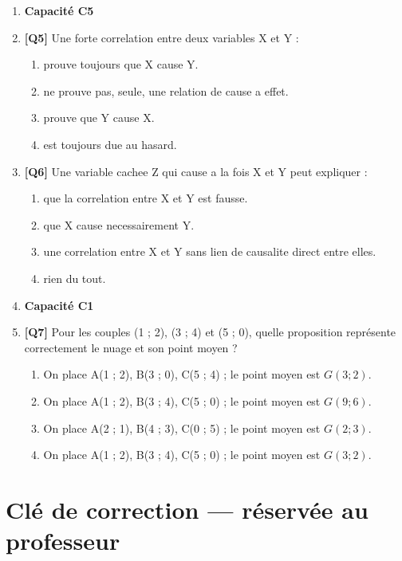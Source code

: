 \begin{enumerate}
\item[] \textbf{Capacité C5}

\item \textbf{[Q5]} Une forte correlation entre deux variables X et Y :
  \begin{enumerate}[label=\Alph*.]
    \item prouve toujours que X cause Y.
    \item ne prouve pas, seule, une relation de cause a effet.
    \item prouve que Y cause X.
    \item est toujours due au hasard.
  \end{enumerate}

\item \textbf{[Q6]} Une variable cachee Z qui cause a la fois X et Y peut expliquer :
  \begin{enumerate}[label=\Alph*.]
    \item que la correlation entre X et Y est fausse.
    \item que X cause necessairement Y.
    \item une correlation entre X et Y sans lien de causalite direct entre elles.
    \item rien du tout.
  \end{enumerate}

\item[] \textbf{Capacité C1}

\item \textbf{[Q7]} Pour les couples (1 ; 2), (3 ; 4) et (5 ; 0), quelle proposition représente correctement le nuage et son point moyen ?
  \begin{enumerate}[label=\Alph*.]
    \item On place A(1 ; 2), B(3 ; 0), C(5 ; 4) ; le point moyen est $G(3 ; 2)$.
    \item On place A(1 ; 2), B(3 ; 4), C(5 ; 0) ; le point moyen est $G(9 ; 6)$.
    \item On place A(2 ; 1), B(4 ; 3), C(0 ; 5) ; le point moyen est $G(2 ; 3)$.
    \item On place A(1 ; 2), B(3 ; 4), C(5 ; 0) ; le point moyen est $G(3 ; 2)$.
  \end{enumerate}

\end{enumerate}

\ifnxVersionProfesseur
\clearpage
\section*{Clé de correction — réservée au professeur}

